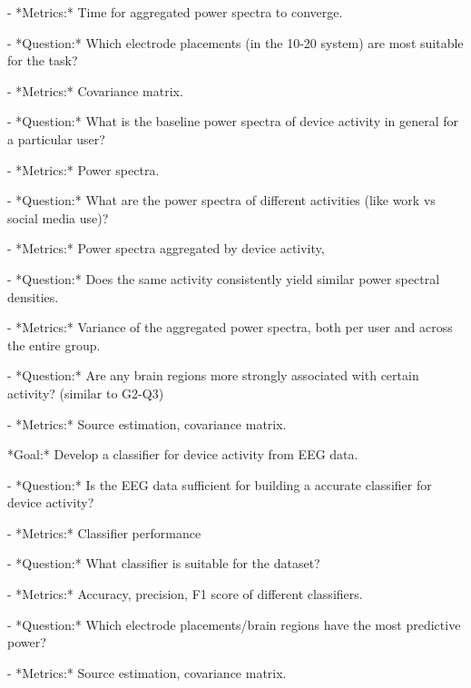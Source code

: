 \documentclass{IEEEtran}
\begin{document}
\begin{refsection}
\begin{markdown}
    - *Metrics:* Time for aggregated power spectra to converge.

 - *Question:* Which electrode placements (in the 10-20 system) are most suitable for the task?

    - *Metrics:* Covariance matrix.

 - *Question:* What is the baseline power spectra of device activity in general for a particular user?

    - *Metrics:* Power spectra.

 - *Question:* What are the power spectra of different activities (like work vs social media use)?

    - *Metrics:* Power spectra aggregated by device activity,

 - *Question:* Does the same activity consistently yield similar power spectral densities.

    - *Metrics:* Variance of the aggregated power spectra, both per user and across the entire group.

 - *Question:* Are any brain regions more strongly associated with certain activity? (similar to G2-Q3)

    - *Metrics:* Source estimation, covariance matrix.
\end{markdown}


\begin{markdown}
*Goal:* Develop a classifier for device activity from EEG data.

 - *Question:* Is the EEG data sufficient for building a accurate classifier for device activity?

    - *Metrics:* Classifier performance

 - *Question:* What classifier is suitable for the dataset?

    - *Metrics:* Accuracy, precision, F1 score of different classifiers.

 - *Question:* Which electrode placements/brain regions have the most predictive power?

    - *Metrics:* Source estimation, covariance matrix.
\end{markdown}

%
%
%


\end{refsection}
\end{document}
